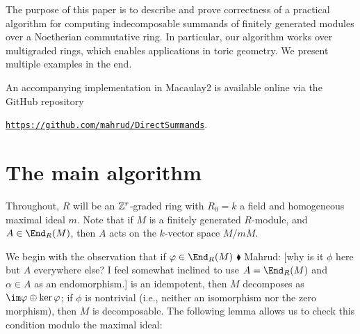 \documentclass{article}
\numberwithin{equation}{section}
\theoremstyle{theorem}
\numberwithin{thm}{section}
\theoremstyle{definition}
\newcommand{\mahrud}[1]{{\color{ForestGreen} \sf $\blacklozenge$ Mahrud: [#1]}}
\begin{document}
The purpose of this paper is to describe and prove correctness of a practical algorithm for computing indecomposable summands of finitely generated modules over a Noetherian commutative ring. In particular, our algorithm works over multigraded rings, which enables applications in toric geometry. We present multiple examples in the end.

An accompanying implementation in Macaulay2 is available online via the GitHub repository \\
\centerline{
  \href{https://github.com/mahrud/DirectSummands}
  {\texttt{https://github.com/mahrud/DirectSummands}}.}


\section{The main algorithm}

Throughout, $R$ will be an $\mathbb Z^r$-graded ring with $R_0 = k$ a field and homogeneous maximal ideal $m$. Note that if $M$ is a finitely generated $R$-module, and $A\in \End_R(M)$, then $A$ acts on the $k$-vector space $M/mM$.

We begin with the observation that if $\phi\in\End_R(M)$\mahrud{why is it $\phi$ here but $A$ everywhere else? I feel somewhat inclined to use $A=\End_R(M)$ and $\alpha\in A$ as an endomorphism.} is an idempotent, then $M$ decomposes as $\im\phi \oplus \ker\phi$; if $\phi$ is nontrivial (i.e., neither an isomorphism nor the zero morphism), then $M$ is decomposable. The following lemma allows us to check this condition modulo the maximal ideal:
\end{document}
